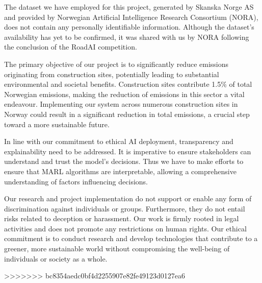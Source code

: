 \documentclass[conference]{IEEEtran}
\begin{document}
The dataset we have employed for this project, generated by Skanska Norge AS and provided by Norwegian
Artificial Intelligence Research Consortium (NORA), does not contain any personally identifiable
information. Although the dataset's availability has yet to be confirmed, it was shared with us by NORA
following the conclusion of the RoadAI competition.

The primary objective of our project is to significantly reduce \coo{} emissions originating from
construction sites, potentially leading to substantial environmental and societal benefits.
Construction sites contribute 1.5\% of total Norwegian \coo{} emissions, making the reduction of
emissions in this sector a vital endeavour. Implementing our system across numerous construction sites
in Norway could result in a significant reduction in total \coo{} emissions, a crucial step toward a more
sustainable future.

In line with our commitment to ethical AI deployment, transparency and explainability need to be
addressed. It is imperative to ensure stakeholders can understand and trust the model's decisions.
Thus we have to make efforts to ensure that MARL algorithms are interpretable, allowing a comprehensive
understanding of factors influencing decisions.

Our research and project implementation do not support or enable any form of discrimination against
individuals or groups. Furthermore, they do not entail risks related to deception or harassment.
Our work is firmly rooted in legal activities and does not promote any restrictions on human rights.
Our ethical commitment is to conduct research and develop technologies that contribute to a greener,
more sustainable world without compromising the well-being of individuals or society as a whole.

\newpage




>>>>>>> bc8354aedc0bf4d2255907e82fe49123d0127ea6
\end{document}
